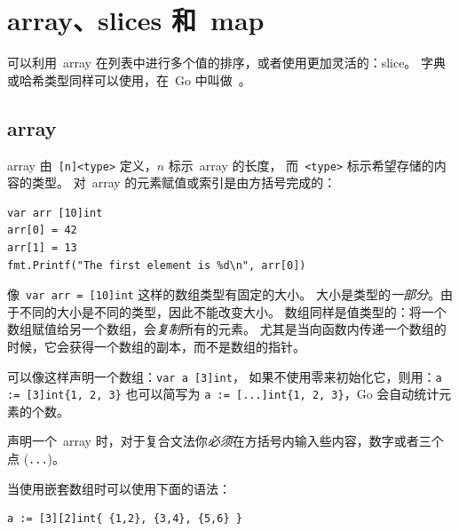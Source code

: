 \section{array、slices 和~map}
\label{sec:arrays}
可以利用~array 在列表中进行多个值的排序，或者使用更加灵活的：slice。
字典或哈希类型同样可以使用，在~Go 中叫做~。

\subsection{array}
array 由~\verb|[n]<type>| 定义，$n$ 标示~array 的长度，
而~\verb|<type>| 标示希望存储的内容的类型。
对~array 的元素赋值或索引是由方括号完成的：
\begin{lstlisting}
var arr [10]int
arr[0] = 42
arr[1] = 13
fmt.Printf("The first element is %d\n", arr[0])
\end{lstlisting}
像~\lstinline{var arr = [10]int} 这样的数组类型有固定的大小。
大小是类型的\emph{一部分}。由于不同的大小是不同的类型，因此不能改变大小。
数组同样是值类型的：将一个数组赋值给另一个数组，会\emph{复制}所有的元素。
尤其是当向函数内传递一个数组的时候，它会获得一个数组的副本，而不是数组的指针。

可以像这样声明一个数组：\lstinline{var a [3]int}，
如果不使用零来初始化它，则用：\lstinline|a := [3]int{1, 2, 3}| 也可以简写为
\lstinline|a := [...]int{1, 2, 3}|，Go 会自动统计元素的个数。

声明一个~array 时，对于复合文法你\emph{必须}在方括号内输入些内容，数字或者三个点
(\verb|...|)。

当使用嵌套数组时可以使用下面的语法：
\begin{lstlisting}
a := [3][2]int{ {1,2}, {3,4}, {5,6} }
\end{lstlisting}

